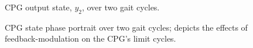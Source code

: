 			\begin{figure}[h!]
				\vspace{-4mm}
				\centering
				\caption{CPG output state, $y_{2}$, over two gait cycles.}
			\end{figure}
			\begin{figure}[h!]
				\centering
				\caption{CPG state phase portrait over two gait cycles; depicts the effects of feedback-modulation on the CPG's limit cycles.}
				\vspace{-6mm}
			\end{figure}



